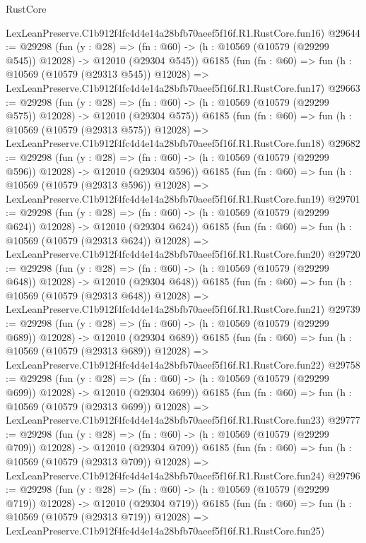 \begin{lexlean}{RustCore}
\begin{coremodule}
    LexLeanPreserve.C1b912f4fc4d4e14a28bfb70aeef5f16f.R1.RustCore.fun16)
@29644 := @29298
    (fun (y : @28) =>
    (fn : @60) -> (h : @10569 (@10579 (@29299 @545)) @12028) -> @12010 (@29304 @545))
    @6185
    (fun (fn : @60) =>
    fun (h : @10569 (@10579 (@29313 @545)) @12028) =>
    LexLeanPreserve.C1b912f4fc4d4e14a28bfb70aeef5f16f.R1.RustCore.fun17)
@29663 := @29298
    (fun (y : @28) =>
    (fn : @60) -> (h : @10569 (@10579 (@29299 @575)) @12028) -> @12010 (@29304 @575))
    @6185
    (fun (fn : @60) =>
    fun (h : @10569 (@10579 (@29313 @575)) @12028) =>
    LexLeanPreserve.C1b912f4fc4d4e14a28bfb70aeef5f16f.R1.RustCore.fun18)
@29682 := @29298
    (fun (y : @28) =>
    (fn : @60) -> (h : @10569 (@10579 (@29299 @596)) @12028) -> @12010 (@29304 @596))
    @6185
    (fun (fn : @60) =>
    fun (h : @10569 (@10579 (@29313 @596)) @12028) =>
    LexLeanPreserve.C1b912f4fc4d4e14a28bfb70aeef5f16f.R1.RustCore.fun19)
@29701 := @29298
    (fun (y : @28) =>
    (fn : @60) -> (h : @10569 (@10579 (@29299 @624)) @12028) -> @12010 (@29304 @624))
    @6185
    (fun (fn : @60) =>
    fun (h : @10569 (@10579 (@29313 @624)) @12028) =>
    LexLeanPreserve.C1b912f4fc4d4e14a28bfb70aeef5f16f.R1.RustCore.fun20)
@29720 := @29298
    (fun (y : @28) =>
    (fn : @60) -> (h : @10569 (@10579 (@29299 @648)) @12028) -> @12010 (@29304 @648))
    @6185
    (fun (fn : @60) =>
    fun (h : @10569 (@10579 (@29313 @648)) @12028) =>
    LexLeanPreserve.C1b912f4fc4d4e14a28bfb70aeef5f16f.R1.RustCore.fun21)
@29739 := @29298
    (fun (y : @28) =>
    (fn : @60) -> (h : @10569 (@10579 (@29299 @689)) @12028) -> @12010 (@29304 @689))
    @6185
    (fun (fn : @60) =>
    fun (h : @10569 (@10579 (@29313 @689)) @12028) =>
    LexLeanPreserve.C1b912f4fc4d4e14a28bfb70aeef5f16f.R1.RustCore.fun22)
@29758 := @29298
    (fun (y : @28) =>
    (fn : @60) -> (h : @10569 (@10579 (@29299 @699)) @12028) -> @12010 (@29304 @699))
    @6185
    (fun (fn : @60) =>
    fun (h : @10569 (@10579 (@29313 @699)) @12028) =>
    LexLeanPreserve.C1b912f4fc4d4e14a28bfb70aeef5f16f.R1.RustCore.fun23)
@29777 := @29298
    (fun (y : @28) =>
    (fn : @60) -> (h : @10569 (@10579 (@29299 @709)) @12028) -> @12010 (@29304 @709))
    @6185
    (fun (fn : @60) =>
    fun (h : @10569 (@10579 (@29313 @709)) @12028) =>
    LexLeanPreserve.C1b912f4fc4d4e14a28bfb70aeef5f16f.R1.RustCore.fun24)
@29796 := @29298
    (fun (y : @28) =>
    (fn : @60) -> (h : @10569 (@10579 (@29299 @719)) @12028) -> @12010 (@29304 @719))
    @6185
    (fun (fn : @60) =>
    fun (h : @10569 (@10579 (@29313 @719)) @12028) =>
    LexLeanPreserve.C1b912f4fc4d4e14a28bfb70aeef5f16f.R1.RustCore.fun25)

\end{coremodule}
\end{lexlean}
